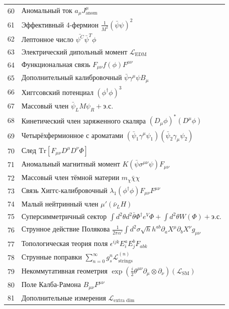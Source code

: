 \documentclass[12pt,a4paper]{article}
\begin{document}
\begin{longtable}{r l}
		60 & Аномальный ток \(a_\mu J^\mu_{\text{anom}}\) \\
		61 & Эффективный 4-фермион \(\frac{1}{M^2}(\bar{\psi}\psi)^2\) \\
		62 & Лептонное число \(\bar{\psi^C}\bar{\psi}^T\phi\) \\
		63 & Электрический дипольный момент \(\mathcal{L}_{\text{EDM}}\) \\
		64 & Функциональная связь \(F_{\mu\nu}f(\phi)F^{\mu\nu}\) \\
		65 & Дополнительный калибровочный \(\bar{\psi}\gamma^\mu\psi B_\mu\) \\
		66 & Хиггсовский потенциал \((\phi^\dagger\phi)^3\) \\
		67 & Массовый член \(\bar{\psi}_L M \psi_R + \text{э.с.}\) \\
		68 & Кинетический член заряженного скаляра \((D_\mu\phi)^*(D^\mu\phi)\) \\
		69 & Четырёхфермионное с ароматами \((\bar{\psi}_1\gamma^\mu\psi_1)(\bar{\psi}_2\gamma_\mu\psi_2)\) \\
		70 & След \(\mathrm{Tr}[F_{\mu\nu}D^\mu D^\nu\Phi]\) \\
		71 & Аномальный магнитный момент \(K(\bar{\psi}\sigma^{\mu\nu}\psi)F_{\mu\nu}\) \\
		72 & Массовый член тёмной материи \(m_\chi\bar{\chi}\chi\) \\
		73 & Связь Хиггс-калибровочный \(\lambda_1(\phi^\dagger\phi)F_{\mu\nu}F^{\mu\nu}\) \\
		74 & Малый нейтринный член \(\mu'(\bar{\nu}_L H)\) \\
		75 & Суперсимметричный сектор \(\int d^2\theta d^2\bar{\theta}\Phi^\dagger e^V\Phi + \int d^2\theta W(\Phi) + \text{э.с.}\) \\
		76 & Струнное действие Полякова \(\frac{1}{2\pi\alpha'}\int d^2\sigma\sqrt{h}h^{ab}\partial_a X^\mu\partial_b X^\nu g_{\mu\nu}\) \\
		77 & Топологическая теория поля \(\epsilon^{ijk}E_i^a E_j^b F_{ab k}\) \\
		78 & Струнные поправки \(\sum_{n=0}^\infty g_s^n \mathcal{L}^{(n)}_{\text{strings}}\) \\
		79 & Некоммутативная геометрия \(\exp\left(\frac{i}{2}\theta^{\mu\nu}\partial_\mu\otimes\partial_\nu\right)(\mathcal{L}_{\text{SM}})\) \\
		80 & Поле Калба-Рамона \(B_{\mu\nu}F^{\mu\nu}\) \\
		81 & Дополнительные измерения \(\mathcal{L}_{\text{extra dim}}\) \\

\end{longtable}
\end{document}
